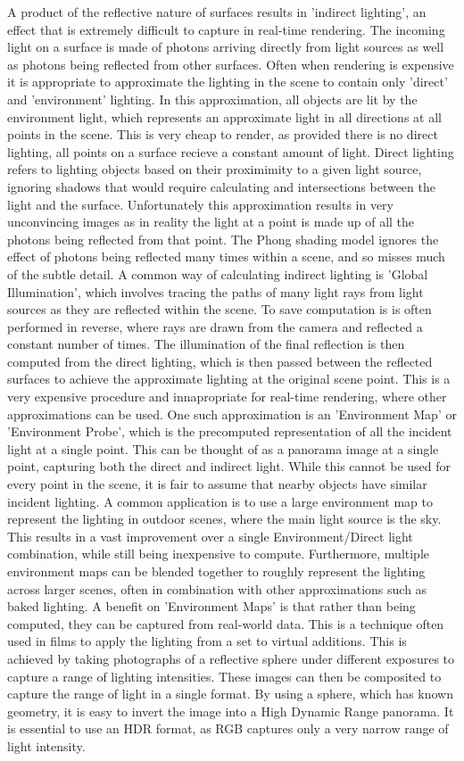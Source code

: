 \documentclass[ %
                    author={Gavin Parker},
                supervisor={Dr. Neill Campbell},
                    degree={MEng},
                     title={Deep Siamese Networks for Illumination Estimation from Stereo Images},
                  subtitle={},
                      type={research},
                      year={2018} ]{dissertation}
\begin{document}
A product of the reflective nature of surfaces results in 'indirect lighting', an effect that is extremely difficult to capture in real-time rendering. The incoming light on a surface is made of photons arriving directly from light sources as well as photons being reflected from other surfaces. Often when rendering is expensive it is appropriate to approximate the lighting in the scene to contain only 'direct' and 'environment' lighting. In this approximation, all objects are lit by the environment light, which represents an approximate light in all directions at all points in the scene. This is very cheap to render, as provided there is no direct lighting, all points on a surface recieve a constant amount of light. Direct lighting refers to lighting objects based on their proximimity to a given light source, ignoring shadows that would require calculating and intersections between the light and the surface. Unfortunately this approximation results in very unconvincing images as in reality the light at a point is made up of all the photons being reflected from that point. The Phong shading model ignores the effect of photons being reflected many times within a scene, and so misses much of the subtle detail. A common way of calculating indirect lighting is 'Global Illumination', which involves tracing the paths of many light rays from light sources as they are reflected within the scene. To save computation is is often performed in reverse, where rays are drawn from the camera and reflected a constant number of times. The illumination of the final reflection is then computed from the direct lighting, which is then passed between the reflected surfaces to achieve the approximate lighting at the original scene point. This is a very expensive procedure and innapropriate for real-time rendering, where other approximations can be used. One such approximation is an 'Environment Map' or 'Environment Probe', which is the precomputed representation of all the incident light at a single point. This can be thought of as a panorama image at a single point, capturing both the direct and indirect light. While this cannot be used for every point in the scene, it is fair to assume that nearby objects have similar incident lighting. A common application is to use a large environment map to represent the lighting in outdoor scenes, where the main light source is the sky. This results in a vast improvement over a single Environment/Direct light combination, while still being inexpensive to compute. Furthermore, multiple environment maps can be blended together to roughly represent the lighting across larger scenes, often in combination with other approximations such as baked lighting.
\newline
A benefit on 'Environment Maps' is that rather than being computed, they can be captured from real-world data. This is a technique often used in films to apply the lighting from a set to virtual additions. This is achieved by taking photographs of a reflective sphere under different exposures to capture a range of lighting intensities. These images can then be composited to capture the range of light in a single format. By using a sphere, which has known geometry, it is easy to invert the image into a High Dynamic Range panorama. It is essential to use an HDR format, as RGB captures only a very narrow range of light intensity.
\end{document}
